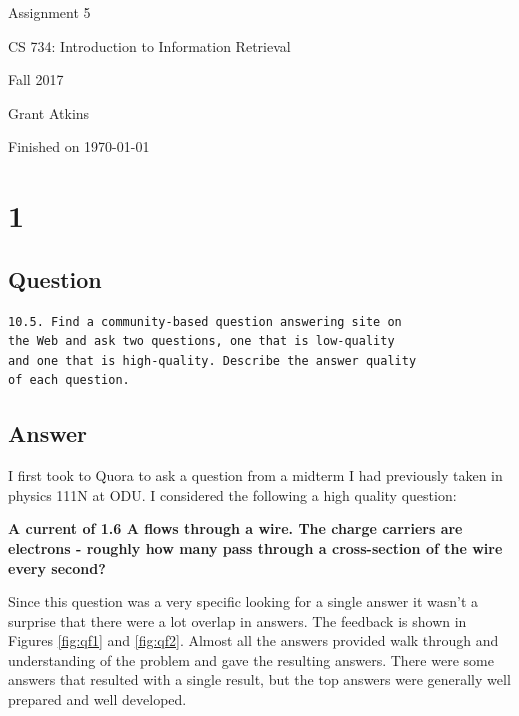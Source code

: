 \documentclass[letterpaper,11pt]{article}
\begin{document}
\begin{titlepage}

\begin{center}

\Huge{Assignment 5}

\Large{CS 734:  Introduction to Information Retrieval}

\Large{Fall 2017}

\Large{Grant Atkins}

\Large Finished on \today

\end{center}

\end{titlepage}

\newpage


\section*{1}

\subsection*{Question}

\begin{verbatim}
10.5. Find a community-based question answering site on 
the Web and ask two questions, one that is low-quality 
and one that is high-quality. Describe the answer quality
of each question.
\end{verbatim}

\subsection*{Answer}

I first took to Quora to ask a question from a midterm I had previously taken in physics 111N at ODU.
I considered the following a high quality question:

\begin{center}
\textbf{A	 current	 of	 1.6	 A	 flows	 through	 a	 wire. The	 charge	 carriers	 are	 electrons	 -
roughly	how	many	pass	through	a	cross-section	of	the	wire	every	second?}
\end{center}

Since this question was a very specific looking for a single answer it wasn't a surprise that there were a lot overlap in answers.
The feedback is shown in Figures \ref{fig:qf1} and \ref{fig:qf2}.
Almost all the answers provided walk through and understanding of the problem and gave the resulting answers.
There were some answers that resulted with a single result, but the top answers were generally well prepared and well developed.
\end{document}

